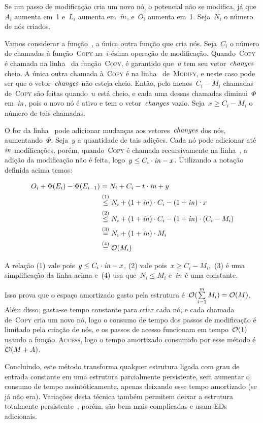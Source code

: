 \documentclass[../../main.tex]{subfiles}
\begin{document}
Se um passo de modificação cria um novo nó, o potencial não se modifica, já que~$A_i$ aumenta em~1 e~$L_i$ aumenta em~$\mathit{in}$, e~$O_i$ aumenta em~1. Seja~$N_i$ o número de nós criados.

Vamos considerar a função~, a única outra função que cria nós. Seja~$C_i$ o número de chamadas à função~\textsc{Copy} na~$i$-ésima operação de modificação. Quando~\textsc{Copy} é chamada na linha~ da função~\textsc{Copy}, é garantido que~$u$ tem seu vetor~$\mathit{changes}$ cheio. A única outra chamada à~\textsc{Copy} é na linha~ de~\textsc{Modify}, e neste caso pode ser que o vetor~$\mathit{changes}$ não esteja cheio. Então, pelo menos~$C_i - M_i$ chamadas de~\textsc{Copy} são feitas quando~$u$ está cheio, e cada uma dessas chamadas diminui~$\Phi$ em~$\mathit{in}$, pois o novo nó é ativo e tem o vetor~$\mathit{changes}$ vazio. Seja~$x \geq C_i - M_i$ o número de tais chamadas.

O for da linha~ pode adicionar mudanças aos vetores~$\mathit{changes}$ dos nós, aumentando~$\Phi$. Seja~$y$ a quantidade de tais adições. Cada nó pode adicionar até~$\mathit{in}$ modificações, porém, quando~\textsc{Copy} é chamada recursivamente na linha~, a adição da modificação não é feita, logo~$y \leq C_i \cdot \mathit{in} - x$. Utilizando a notação definida acima temos:

\begin{align*}
	O_i + \Phi(E_i) - \Phi(E_{i-1}) & = N_i + C_i - t \cdot \mathit{in} + y
	\\ &\stackrel{\text{(1)}}{\leq} N_i + (1 + \mathit{in})\cdot C_i - (1 + \mathit{in}) \cdot x
	\\ &\stackrel{\text{(2)}}{\leq} N_i + (1 + \mathit{in})\cdot C_i - (1 + \mathit{in}) \cdot (C_i - M_i)
	\\ &\stackrel{\text{(3)}}{=} N_i + (1 + \mathit{in}) \cdot M_i
	\\ &\stackrel{\text{(4)}}{=} \mathcal{O}(M_i)
\end{align*}

A relação (1) vale pois~$y \leq C_i \cdot \mathit{in} - x$, (2) vale pois~$x \geq C_i - M_i$,~(3) é uma simplificação da linha acima e~(4) usa que~$N_i \leq M_i$ e~$\mathit{in}$ é uma constante.

Isso prova que o espaço amortizado gasto pela estrutura é~${\mathcal{O}(\sum\limits_{i=1}^m{M_i}) = \mathcal{O}(M)}$. Além disso, gasta-se tempo constante para criar cada nó, e cada chamada de~\textsc{Copy} cria um novo nó, logo o consumo de tempo dos passos de modificação é limitado pela criação de nós, e os passos de acesso funcionam em tempo~$\mathcal{O}(1)$ usando a função~\textsc{Access}, logo o tempo amortizado consumido por esse método é~$\mathcal{O}(M+A)$.

Concluindo, este método transforma qualquer estrutura ligada com grau de entrada constante em uma estrutura parcialmente persistente, sem aumentar o consumo de tempo assintóticamente, apenas deixando esse tempo amortizado (se já não era). Variações desta técnica também permitem deixar a estrutura totalmente persistente~\cite{DriscollSST1989}, porém, são bem mais complicadas e usam EDs adicionais.
\end{document}
